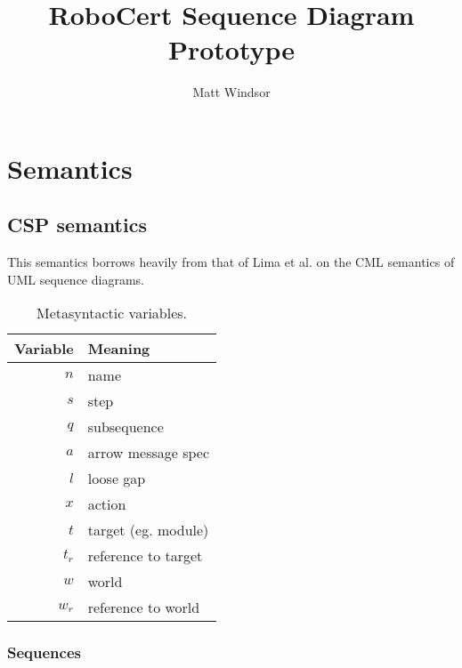\documentclass[a4paper,11pt]{report}
\title{RoboCert Sequence Diagram Prototype}
\author{Matt Windsor}
\theoremstyle{definition}
\newcommand{\thead}[1]{\textbf{#1}}
\newcommand{\anarrow}{a}
\newcommand{\anlgap}{l}
\newcommand{\aname}{n}
\newcommand{\asseq}{q}
\newcommand{\astep}{s}
\newcommand{\atarget}{t}
\newcommand{\aworld}{w}
\newcommand{\anaction}{x}
\newcommand{\refto}[1]{#1_r}
\begin{document}
\maketitle

\chapter{Semantics}

\section{CSP semantics}

This semantics borrows heavily from that of Lima et al. on the CML semantics of
UML sequence diagrams.

\newcommand{\sema}[1]{\llbracket #1 \rrbracket}
\newcommand{\stepsema}[1]{\sema{#1}^{\text{step}}}
\newcommand{\lgapsema}[2]{\sema{#1}^{\text{lgap}}_{(#2)}}
\newcommand{\actsema}[1]{\sema{#1}^{\text{act}}}
\newcommand{\arrsema}[1]{\sema{#1}^{\text{arr}}}
\newcommand{\loopsema}[2]{\sema{#1}^{\text{loop}}_{(#2)}}
\newcommand{\seqsema}[1]{\sema{#1}^{\text{seq}}}
\newcommand{\sseqsema}[1]{\sema{#1}^{\text{sseq}}}

\begin{table}
	\centering

	\begin{tabular}{rl}
	\toprule
	\thead{Variable} & \thead{Meaning}
	\\
	\midrule
	\(\aname\) & name
	\\
	\(\astep\) & step
	\\
	\(\asseq\) & subsequence
	\\
	\(\anarrow\) & arrow message spec
	\\
	\(\anlgap\) & loose gap
	\\
	\(\anaction\) & action
	\\
	\midrule
	\(\atarget\) & target (eg. module)
	\\
	\(\refto{\atarget}\) & reference to target
	\\
	\(\aworld\) & world
	\\
	\(\refto{\aworld}\) & reference to world
	\\
	\bottomrule
	\end{tabular}

	\caption{Metasyntactic variables.}
	\label{tab:metasyntactic-variables}
\end{table}

\subsection{Sequences}
\end{document}
